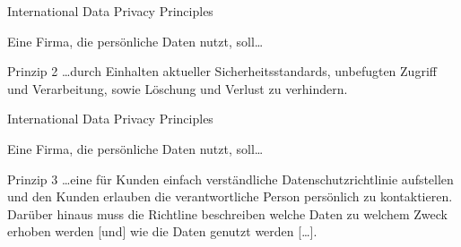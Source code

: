 \begin{frame}{International Data Privacy Principles}


    Eine Firma, die persönliche Daten nutzt, soll\dots

    \begin{block}{Prinzip 2 \cite{zankl_international_2014}}
        \dots durch Einhalten aktueller Sicherheitsstandards, unbefugten Zugriff und Verarbeitung, sowie Löschung und Verlust zu verhindern.
    \end{block}


\end{frame}

\begin{frame}{International Data Privacy Principles}


    Eine Firma, die persönliche Daten nutzt, soll\dots

    \begin{block}{Prinzip 3 \cite{zankl_international_2014}}
        \dots eine für Kunden einfach verständliche Datenschutzrichtlinie aufstellen und den Kunden erlauben die verantwortliche Person persönlich zu kontaktieren.
        Darüber hinaus muss die Richtline beschreiben welche Daten zu welchem Zweck erhoben werden [und] wie die Daten genutzt werden [\dots].
    \end{block}


\end{frame}

